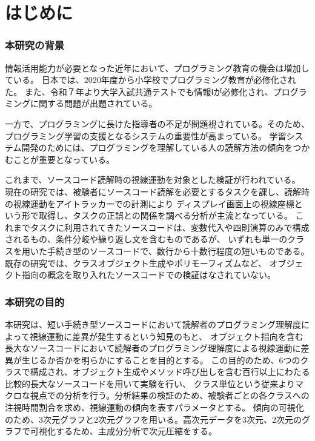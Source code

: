 \documentclass[paper=a4paper,fontsize=11pt]{jlreq}
\begin{document}
\tableofcontents
\clearpage

\part{はじめに}
  \section{本研究の背景}
    情報活用能力が必要となった近年において、プログラミング教育の機会は増加している。
    日本では、2020年度から小学校でプログラミング教育が必修化された\cite{syougaku_program}。
    また、令和７年より大学入試共通テストでも情報Ⅰが必修化され、プログラミングに関する問題が出題されている\cite{tusuto_mondai}。

    一方で、プログラミングに長けた指導者の不足が問題視されている。そのため、プログラミング学習の支援となるシステムの重要性が高まっている。
    学習システム開発のためには、プログラミングを理解している人の読解方法の傾向をつかむことが重要となっている。
    
    これまで、ソースコード読解時の視線運動を対象とした検証が行われている\cite{meiji2021}\cite{hanafusa}\cite{uwano}。
    現在の研究では、被験者にソースコード読解を必要とするタスクを課し、読解時の視線運動をアイトラッカーでの計測により
    ディスプレイ画面上の視線座標という形で取得し、タスクの正誤との関係を調べる分析が主流となっている。
    これまでタスクに利用されてきたソースコードは、変数代入や四則演算のみで構成されるもの、条件分岐や繰り返し文を含むものであるが、
    いずれも単一のクラスを用いた手続き型のソースコードで、数行から十数行程度の短いものである。既存の研究では、クラスオブジェクト生成やポリモーフィズムなど、
    オブジェクト指向の概念を取り入れたソースコードでの検証はなされていない。
  \clearpage
  
  \section{本研究の目的}
    本研究は、短い手続き型ソースコードにおいて読解者のプログラミング理解度によって視線運動に差異が発生するという知見のもと、
    オブジェクト指向を含む長大なソースコードにおいて読解者のプログラミング理解度による視線運動に差異が生じるか否かを明らかにすることを目的とする。
    この目的のため、6つのクラスで構成され、オブジェクト生成やメソッド呼び出しを含む百行以上にわたる比較的長大なソースコードを用いて実験を行い、
    クラス単位という従来よりマクロな視点での分析を行う。分析結果の検証のため、被験者ごとの各クラスへの注視時間割合を求め、視線運動の傾向を表すパラメータとする。
    傾向の可視化のため、3次元グラフと2次元グラフを用いる。高次元データを3次元、2次元のグラフで可視化するため、主成分分析で次元圧縮をする。
    \clearpage
\end{document}
